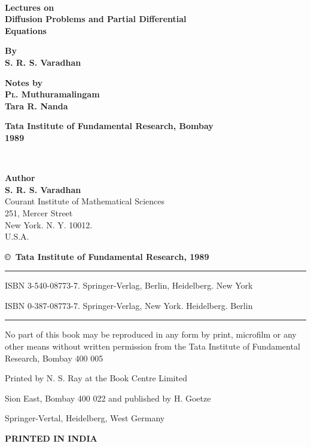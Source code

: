 ~\phantom{a}
\thispagestyle{empty}
\begin{center}
{\Large\bf Lectures on}\\[5pt]
{\Large\bf Diffusion Problems and Partial Differential}\\[5pt]
{\Large\bf Equations}
\vfill

{\bf By}\\[5pt]
{\large\bf S. R. S. Varadhan}

\vfill

{\bf Notes by}\\
{\large\bf \textsc{Pl}. Muthuramalingam}\\
{\large\bf Tara R. Nanda}

\vfill

{\large\bf Tata Institute of Fundamental Research, Bombay}\\
{\large\bf 1989}
\end{center}
\eject

~\phantom{a}
\thispagestyle{empty}
\begin{center}
{\large\bf Author}\\[4pt]
{\large\bf S. R. S. Varadhan}\\
{Courant Institute of Mathematical Sciences}\\
{251, Mercer Street}\\
{New York. N. Y. 10012.}\\
{U.S.A.}
\vfill

{\bf\copyright\ Tata Institute of Fundamental Research, 1989}

\vskip 1cm

\noindent
\rule{\textwidth}{1pt}

\noindent
{\small ISBN 3-540-08773-7. Springer-Verlag, Berlin, Heidelberg. New
York}

\noindent

{\small ISBN 0-387-08773-7. Springer-Verlag, New
York. Heidelberg. Berlin}

\noindent
\rule{\textwidth}{1pt}


\vfill

\parbox{0.7\textwidth}{No part of this book may be reproduced in any
  form by print, microfilm or any other means without written
  permission from the Tata Institute of Fundamental Research,
  Bombay 400 005}

\vfill
Printed by N. S. Ray at the Book Centre Limited

Sion East, Bombay 400 022 and published by H. Goetze

Springer-Vertal, Heidelberg, West Germany
\bigskip

{\bf PRINTED IN INDIA}
\end{center}

\eject


